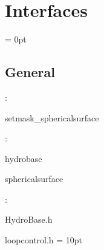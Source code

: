 
\section{Interfaces} 


\parskip = 0pt

\vspace{3mm} \subsection*{General}

: 

setmask\_sphericalsurface
\vspace{2mm}

: 

hydrobase

sphericalsurface
\vspace{2mm}

\vspace{5mm}

: 

HydroBase.h

loopcontrol.h
\vspace{2mm}\parskip = 10pt 

